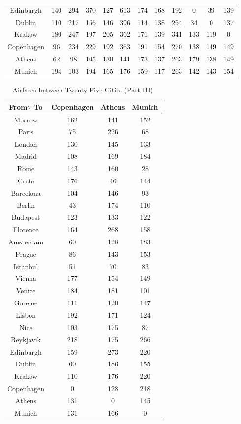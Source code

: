\documentclass[12pt]{article}
\begin{document}
\begin{landscape}
\begin{table}[h]
\begin{tabular}{c|c|c|c|c|c|c|c|c|c|c|c}
Edinburgh & 140 & 294 & 370 & 127 & 613 & 174 & 168 & 192 & 0 & 39 & 139 \\
Dublin & 110 & 217 & 156 & 146 & 396 & 114 & 138 & 254 & 34 & 0 & 137 \\
Krakow & 180 & 247 & 197 & 205 & 362 & 171 & 139 & 341 & 133 & 119 & 0 \\
Copenhagen & 96 & 234 & 229 & 192 & 363 & 191 & 154 & 270 & 138 & 149 & 149 \\
Athens & 62 & 98 & 105 & 130 & 141 & 173 & 137 & 263 & 179 & 138 & 149 \\
Munich & 194 & 103 & 194 & 165 & 176 & 159 & 117 & 263 & 142 & 143 & 154 \\
\end{tabular}
\end{table}
\end{landscape}

\pagebreak

\begin{table}[h]
\caption{Airfares between Twenty Five Cities (Part III)}
\centering
\vspace{1mm}
\begin{tabular}{c|c|c|c}
\hline
\rule{0pt}{2ex} From$\backslash$ To & Copenhagen & Athens & Munich  \\
\hline
\rule{0pt}{2ex}Moscow &  162 & 141 & 152 \\
Paris & 75 & 226 & 68 \\
London & 130 & 145 & 133 \\
Madrid & 108 & 169 & 184 \\
Rome & 143 & 160 & 28 \\
Crete & 176 & 46 & 144 \\
Barcelona & 104 & 146 & 93 \\
Berlin & 43 & 174 & 110 \\
Budapest & 123 & 133 & 122 \\
Florence & 164 & 268 & 158 \\
Amsterdam & 60 & 128 & 183 \\
Prague & 86 & 143 & 153 \\
Istanbul & 51 & 70 & 83 \\
Vienna & 177 & 154 & 149 \\
Venice & 184 & 181 & 101 \\
Goreme & 111 & 120 & 147 \\
Lisbon & 192 & 171 & 124 \\
Nice & 103 & 175 & 87 \\
Reykjavik & 218 & 175 & 266 \\
Edinburgh & 159 & 273 & 220 \\
Dublin & 60 & 186 & 155 \\
Krakow & 110 & 176 & 220 \\
Copenhagen & 0 & 128 & 218 \\
Athens & 131 & 0 & 145 \\
Munich & 131 & 166 & 0 \\
\end{tabular}
\end{table}
\pagebreak
\end{document}
